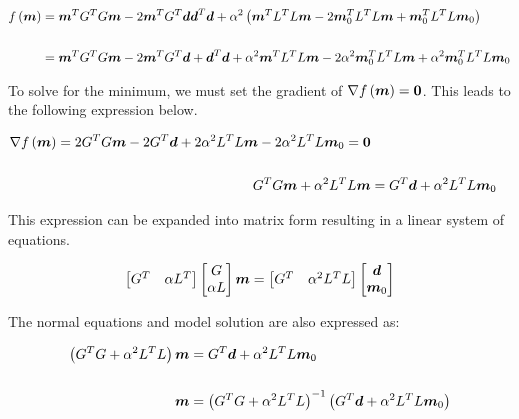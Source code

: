 \begin{align*}
	f \left( \boldsymbol{m} \right) &= \boldsymbol{m}^T G^T G \boldsymbol{m} - 2 \boldsymbol{m}^T G^T \boldsymbol{d} \boldsymbol{d}^T \boldsymbol{d} + \alpha^2 \left( \boldsymbol{m}^T L^T L \boldsymbol{m} - 2 \boldsymbol{m}_0^T L^T L \boldsymbol{m} + \boldsymbol{m}_0^T L^T L \boldsymbol{m}_0 \right) \\
	\\
	&= \boldsymbol{m}^T G^T G \boldsymbol{m} - 2 \boldsymbol{m}^T G^T \boldsymbol{d} + \boldsymbol{d}^T \boldsymbol{d} + \alpha^2 \boldsymbol{m}^T L^T L \boldsymbol{m} - 2 \alpha^2 \boldsymbol{m}_0^T L^T L \boldsymbol{m} + \alpha^2 \boldsymbol{m}_0^T L^T L \boldsymbol{m}_0
\end{align*}

To solve for the minimum, we must set the gradient of $\nabla f \left( \boldsymbol{m} \right) = \boldsymbol{0}$. This leads to the following expression below. 

\begin{align*}
	\nabla f \left( \boldsymbol{m} \right) = 2 G^T G \boldsymbol{m} - 2 G^T \boldsymbol{d} + 2 \alpha^2 L^T L \boldsymbol{m} - 2 \alpha^2 L^T L \boldsymbol{m}_0 = \boldsymbol{0} \\
	\\
	G^T G \boldsymbol{m} + \alpha^2 L^T L \boldsymbol{m} &= G^T \boldsymbol{d} + \alpha^2 L^T L \boldsymbol{m}_0
\end{align*}

This expression can be expanded into matrix form resulting in a linear system of equations. 

\begin{align*}
	\begin{bmatrix} G^T & \alpha L^T \end{bmatrix} \begin{bmatrix} G \\ \alpha L \end{bmatrix} \boldsymbol{m} = \begin{bmatrix} G^T & \alpha^2 L^T L \end{bmatrix} \begin{bmatrix} \boldsymbol{d} \\ \boldsymbol{m}_0 \end{bmatrix}
\end{align*}

The normal equations and model solution are also expressed as:

\begin{align*}
	\left(G^T G + \alpha^2 L^T L \right) \boldsymbol{m} &= G^T \boldsymbol{d} + \alpha^2 L^T L \boldsymbol{m}_0 \\
	\\
	\boldsymbol{m} &= \left(G^T G + \alpha^2 L^T L \right)^{-1} \left( G^T \boldsymbol{d} + \alpha^2 L^T L \boldsymbol{m}_0 \right)
\end{align*}


